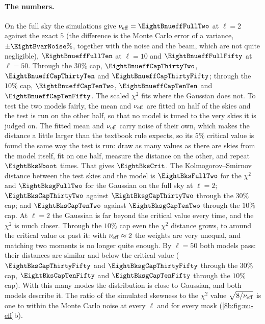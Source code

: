 \paragraph{The numbers.}
On the full sky the simulations give $\nu_{\rm eff}=\EightBnueffFullTwo$ at $\ell=2$ against the exact $5$ (the
difference is the Monte Carlo error of a variance, $\pm\EightBvarNoise\%$, together with the noise and the
beam, which are not quite negligible), $\EightBnueffFullTen$ at $\ell=10$ and $\EightBnueffFullFifty$ at $\ell=50$.
Through the $30\%$ cap, $\EightBnueffCapThirtyTwo$, $\EightBnueffCapThirtyTen$ and $\EightBnueffCapThirtyFifty$; through the $10\%$ cap,
$\EightBnueffCapTenTwo$, $\EightBnueffCapTenTen$ and $\EightBnueffCapTenFifty$. The scaled $\chi^2$ fits where the Gaussian does not.
To test the two models fairly, the mean and $\nu_{\rm eff}$ are fitted on half of the skies and the
test is run on the other half, so that no model is tuned to the very skies it is judged on.
The fitted mean and $\nu_{\rm eff}$ carry noise of their own, which makes the distance a little larger than the
textbook rule expects, so its $5\%$ critical value is found the same way the test is run: draw as many values as there are
skies from the model itself, fit on one half, measure the distance on the other, and repeat
$\EightBksNboot$ times. That gives $\EightBksCrit$. The Kolmogorov--Smirnov distance between the test skies and the
model is $\EightBksFullTwo$ for the $\chi^2$ and $\EightBksgFullTwo$ for the
Gaussian on the full sky at $\ell=2$; $\EightBksCapThirtyTwo$ against $\EightBksgCapThirtyTwo$ through the $30\%$ cap; and
$\EightBksCapTenTwo$ against $\EightBksgCapTenTwo$ through the $10\%$ cap. At $\ell=2$ the Gaussian is far beyond the
critical value every time, and the $\chi^2$ is much closer. Through the $10\%$ cap even the $\chi^2$ distance grows, to
around the critical value or past it: with $\nu_{\rm eff}\approx2$ the weights are very unequal, and matching two
moments is no longer quite enough. By $\ell=50$ both models pass: their distances are
similar and below the critical value ($\EightBksCapThirtyFifty$ and $\EightBksgCapThirtyFifty$ through the $30\%$ cap,
$\EightBksCapTenFifty$ and $\EightBksgCapTenFifty$ through the $10\%$ cap). With this many modes the distribution is close to Gaussian, and both models describe it. The ratio of the simulated skewness to the $\chi^2$
value $\sqrt{8/\nu_{\rm eff}}$ is one to within the Monte Carlo noise at every $\ell$ and for every mask
(\cref{8b:fig:nu-eff}b).

